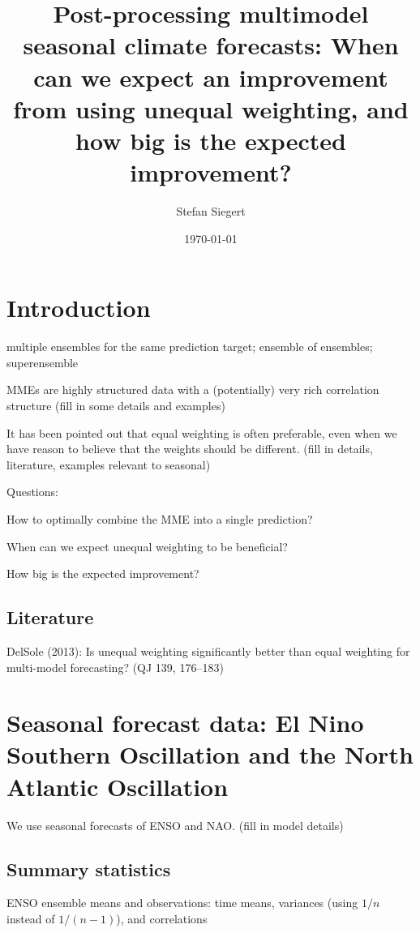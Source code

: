 \documentclass[12pt]{article}
\author{Stefan Siegert}
\title{Post-processing multimodel seasonal climate forecasts: When can we expect an improvement from using unequal weighting, and how big is the expected improvement?}
\date{\today}
\begin{document}
\maketitle
\thispagestyle{empty}

\tableofcontents

\section{Introduction}

multiple ensembles for the same prediction target; ensemble of ensembles; superensemble

MMEs are highly structured data with a (potentially) very rich correlation structure (fill in some details and examples)

It has been pointed out that equal weighting is often preferable, even when we have reason to believe that the weights should be different.
(fill in details, literature, examples relevant to seasonal)

Questions:

How to optimally combine the MME into a single prediction?

When can we expect unequal weighting to be beneficial? 

How big is the expected improvement?


\subsection{Literature}

DelSole (2013): Is unequal weighting significantly better than equal weighting for multi-model forecasting? (QJ 139, 176--183)



\section{Seasonal forecast data: El Nino Southern Oscillation and the North Atlantic Oscillation}

We use seasonal forecasts of ENSO and NAO.
(fill in model details)

\subsection{Summary statistics}

ENSO ensemble means and observations: time means, variances (using $1/n$ instead of $1/(n-1)$), and correlations
\end{document}
